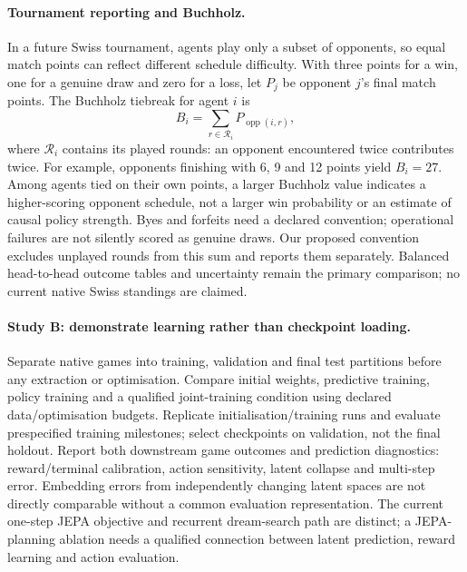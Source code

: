 \documentclass[11pt,a4paper]{article}
\theoremstyle{definition}
\theoremstyle{plain}
\begin{document}
\paragraph{Tournament reporting and Buchholz.}
In a future Swiss tournament, agents play only a subset of opponents, so
equal match points can reflect different schedule difficulty. With three
points for a win, one for a genuine draw and zero for a loss, let $P_j$
be opponent $j$'s final match points. The Buchholz tiebreak for agent $i$ is
\begin{equation}
B_i=\sum_{r\in\mathcal{R}_i} P_{\operatorname{opp}(i,r)},
\end{equation}
where $\mathcal{R}_i$ contains its played rounds: an opponent encountered
twice contributes twice. For example, opponents finishing with 6, 9 and
12 points yield $B_i=27$. Among agents tied on their own points, a larger
Buchholz value indicates a higher-scoring opponent schedule, not a larger
win probability or an estimate of causal policy strength. Byes and forfeits
need a declared convention; operational failures are not silently scored
as genuine draws. Our proposed convention excludes unplayed rounds from
this sum and reports them separately. Balanced head-to-head outcome tables
and uncertainty remain the primary comparison; no current native Swiss
standings are claimed.

\paragraph{Study B: demonstrate learning rather than checkpoint loading.}
Separate native games into training, validation and final test partitions
before any extraction or optimisation. Compare initial weights, predictive
training, policy training and a qualified joint-training condition using
declared data/optimisation budgets. Replicate initialisation/training runs
and evaluate prespecified training milestones; select checkpoints on validation,
not the final holdout. Report both downstream game outcomes and prediction
diagnostics: reward/terminal calibration, action sensitivity, latent collapse
and multi-step error. Embedding errors from independently changing latent
spaces are not directly comparable without a common evaluation representation.
The current one-step JEPA objective and recurrent dream-search path are
distinct; a JEPA-planning ablation needs a qualified connection between
latent prediction, reward learning and action evaluation.
\end{document}
